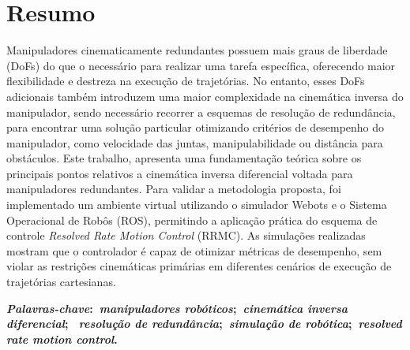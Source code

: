 \chapter*{Resumo}
\noindent Manipuladores cinematicamente redundantes possuem mais graus de liberdade (DoFs) do 
que o necessário para realizar uma tarefa específica, oferecendo maior flexibilidade e destreza na execução de trajetórias. 
No entanto, esses DoFs adicionais também introduzem uma maior complexidade na cinemática inversa do manipulador, sendo necessário 
recorrer a esquemas de resolução de redundância, para encontrar uma solução particular otimizando critérios de desempenho do manipulador,
como velocidade das juntas, manipulabilidade ou distância para obstáculos. Este trabalho, apresenta uma fundamentação teórica sobre 
os principais pontos relativos a cinemática inversa diferencial voltada para manipuladores redundantes. Para validar a metodologia proposta,
foi implementado um ambiente virtual utilizando o simulador Webots e o Sistema Operacional de Robôs (ROS), permitindo a aplicação prática do 
esquema de controle \emph{Resolved Rate Motion Control} (RRMC). As simulações realizadas mostram que o controlador é capaz de otimizar
métricas de desempenho, sem violar as restrições cinemáticas primárias em diferentes cenários de execução de trajetórias cartesianas.

\vspace{5mm}

\noindent\textbf{
    \textit{Palavras-chave}:~\textit{manipuladores robóticos};~\textit{cinemática inversa diferencial};
    ~\textit{resolução de redundância};~\textit{simulação de robótica};~\textit{resolved rate motion control}.
}
